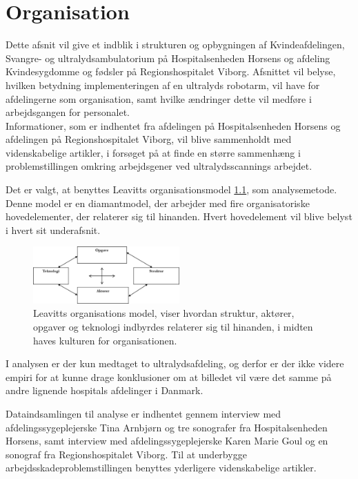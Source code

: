 \chapter{Organisation}
Dette afsnit vil give et indblik i strukturen og opbygningen af Kvindeafdelingen, Svangre- og ultralydsambulatorium på Hospitalsenheden Horsens og afdeling Kvindesygdomme og fødsler på Regionshospitalet Viborg. Afsnittet vil belyse, hvilken betydning implementeringen af en ultralyds robotarm, vil have for afdelingerne som organisation, samt hvilke ændringer dette vil medføre i arbejdsgangen for personalet. \\
Informationer, som er indhentet fra afdelingen på Hospitalsenheden Horsens og afdelingen på Regionshospitalet Viborg, vil blive sammenholdt med videnskabelige artikler, i forsøget på at finde en større sammenhæng i problemstillingen omkring arbejdsgener ved ultralydsscannings arbejdet.

Det er valgt, at benyttes Leavitts organisationsmodel \ref{LeavittModel}, som analysemetode. Denne model er en diamantmodel, der arbejder med fire organisatoriske hovedelementer, der relaterer sig til hinanden. Hvert hovedelement vil blive belyst i hvert sit underafsnit. \cite{EMU2016}

\begin{figure}[h!]\centering
	\includegraphics[width = 0.5\textwidth]{Figurer/LeavittModel}
	\caption{Leavitts organisations model, viser hvordan struktur, aktører, opgaver og teknologi indbyrdes relaterer sig til hinanden, i midten haves kulturen for organisationen.}
	\label{LeavittModel}
\end{figure}
I analysen er der kun medtaget to ultralydsafdeling, og derfor er der ikke videre empiri for at kunne drage konklusioner om at billedet vil være det samme på andre lignende hospitals afdelinger i Danmark. 

Dataindsamlingen til analyse er indhentet gennem interview med afdelingssygeplejerske Tina Arnbjørn og tre sonografer fra Hospitalsenheden Horsens, samt interview med afdelingssygeplejerske Karen Marie Goul og en sonograf fra Regionshospitalet Viborg.
Til at underbygge arbejdsskadeproblemstillingen benyttes yderligere videnskabelige artikler.

